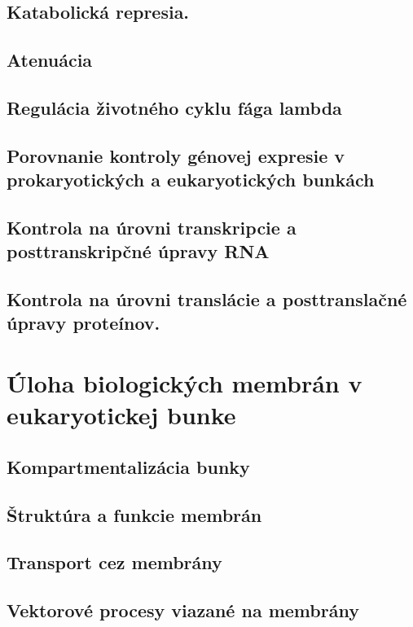 \subsection*{Katabolická represia.}

\subsection*{Atenuácia}

\subsection*{Regulácia životného cyklu fága lambda}

\subsection*{Porovnanie kontroly génovej expresie v prokaryotických a eukaryotických bunkách}

\subsection*{Kontrola na úrovni transkripcie a posttranskripčné úpravy RNA}

\subsection*{Kontrola na úrovni translácie a posttranslačné úpravy proteínov.}

\section{Úloha biologických membrán v eukaryotickej bunke}

\subsection*{Kompartmentalizácia bunky}

\subsection*{Štruktúra a funkcie membrán}

\subsection*{Transport cez membrány}

\subsection*{Vektorové procesy viazané na membrány}

